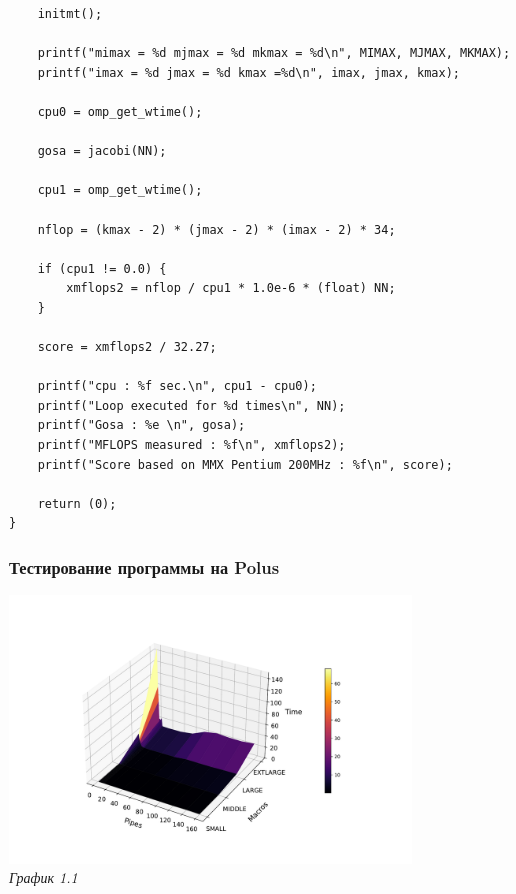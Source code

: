 \documentclass[a4paper, 11pt]{article}
\begin{document}
\begin{lstlisting}
    initmt();

    printf("mimax = %d mjmax = %d mkmax = %d\n", MIMAX, MJMAX, MKMAX);
    printf("imax = %d jmax = %d kmax =%d\n", imax, jmax, kmax);

    cpu0 = omp_get_wtime();

    gosa = jacobi(NN);

    cpu1 = omp_get_wtime();

    nflop = (kmax - 2) * (jmax - 2) * (imax - 2) * 34;

    if (cpu1 != 0.0) {
        xmflops2 = nflop / cpu1 * 1.0e-6 * (float) NN;
    }

    score = xmflops2 / 32.27;

    printf("cpu : %f sec.\n", cpu1 - cpu0);
    printf("Loop executed for %d times\n", NN);
    printf("Gosa : %e \n", gosa);
    printf("MFLOPS measured : %f\n", xmflops2);
    printf("Score based on MMX Pentium 200MHz : %f\n", score);

    return (0);
}
\end{lstlisting}
\newpage


\subsubsection*{Тестирование программы на Polus}

\begin{center}
    \includegraphics[width=0.8\textwidth]{../graph/for.pdf} \\
    \small \it
    График 1.1
\end{center}
\end{document}
